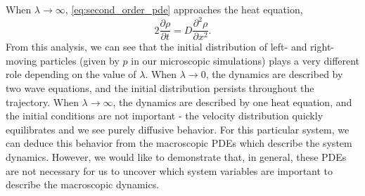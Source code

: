 \documentclass[prl, reprint, final, showkeys]{revtex4-1}
\begin{document}
When $\lambda \rightarrow \infty$, \eqref{eq:second_order_pde} approaches the heat equation,
\begin{equation}
2 \frac{\partial \rho}{\partial t} = D \frac{\partial ^2 \rho}{\partial x^2}.
\end{equation}
%
From this analysis, we can see that the initial distribution of left- and right-moving particles (given by $p$ in our microscopic simulations) plays a very different role depending on the value of $\lambda$.
%
When $\lambda \rightarrow 0$, the dynamics are described by two wave equations, and the initial distribution persists throughout the trajectory.
%
When $\lambda \rightarrow \infty$, the dynamics are described by one heat equation, and the initial conditions are not important - the velocity distribution quickly equilibrates and we see purely diffusive behavior.
%
For this particular system, we can deduce this behavior from the macroscopic PDEs which describe the system dynamics.
%
However, we would like to demonstrate that, in general, these PDEs are not necessary for us to uncover which system variables are important to describe the macroscopic dynamics.
 


\end{document}
